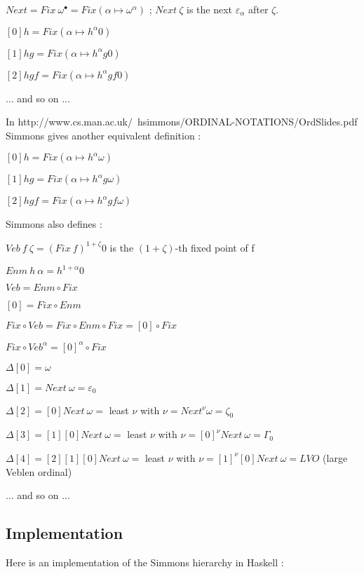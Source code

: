 \documentclass[10pt]{article}
\begin{document}
\( Next = Fix\ \omega^\bullet = Fix (\alpha \mapsto \omega^\alpha) \) ; \( Next\ \zeta \) is the next \( \varepsilon_\alpha \) after \( \zeta \).

\( [0] h = Fix (\alpha \mapsto h^\alpha 0) \)

\( [1] h g = Fix (\alpha \mapsto h^\alpha g 0) \)

\( [2] h g f = Fix (\alpha \mapsto h^\alpha g f 0) \) 

... and so on ...

\bigskip

In http://www.cs.man.ac.uk/~hsimmons/ORDINAL-NOTATIONS/OrdSlides.pdf Simmons gives another equivalent definition :

\( [0] h = Fix (\alpha \mapsto h^\alpha \omega) \)

\( [1] h g = Fix (\alpha \mapsto h^\alpha g \omega) \)

\( [2] h g f = Fix (\alpha \mapsto h^\alpha g f \omega) \) 

\bigskip

Simmons also defines : 

\( Veb\ f\ \zeta = (Fix\ f)^{1+\zeta} 0 \) is the \( (1+\zeta) \)-th fixed point of f

\( Enm\ h\ \alpha = h^{1+\alpha} 0 \)

\( Veb = Enm \circ Fix \)

\( [0] = Fix \circ Enm \)

\( Fix \circ Veb = Fix \circ Enm \circ Fix = [0] \circ Fix \)

\( Fix \circ Veb^\alpha = [0]^\alpha \circ Fix \)

\( \Delta[0] = \omega \)

\( \Delta[1] = Next\ \omega = \varepsilon_0 \)

\( \Delta[2] = [0] Next\ \omega = \) least \( \nu \) with \( \nu = Next^\nu \omega = \zeta_0 \)

\( \Delta[3] = [1] [0] Next\ \omega = \) least \( \nu \) with \( \nu = [0]^\nu Next\ \omega = \Gamma_0 \)

\( \Delta[4] = [2] [1] [0] Next\ \omega = \) least \( \nu \) with \( \nu = [1]^\nu [0] Next\ \omega = LVO \) (large Veblen ordinal)

... and so on ...


\subsection{Implementation}

Here is an implementation of the Simmons hierarchy in Haskell :
\end{document}
